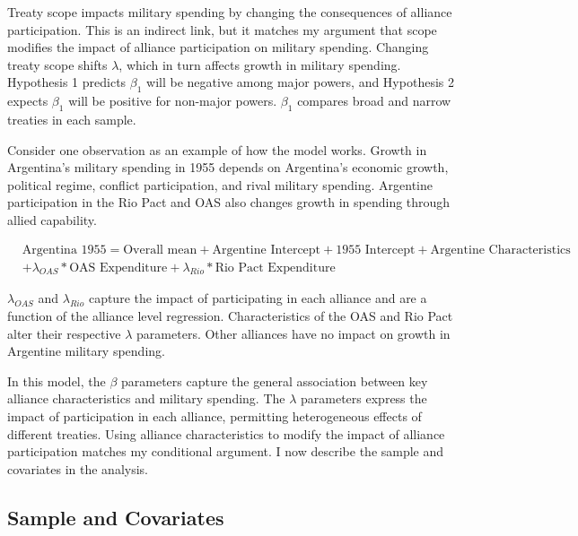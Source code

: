 \documentclass[12pt]{article}
\begin{document}
Treaty scope impacts military spending by changing the consequences of alliance participation.
This is an indirect link, but it matches my argument that scope modifies the impact of alliance participation on military spending.  
Changing treaty scope shifts $\lambda$, which in turn affects growth in military spending.
Hypothesis 1 predicts $\beta_1$ will be negative among major powers, and Hypothesis 2 expects $\beta_1$ will be positive for non-major powers.
$\beta_1$ compares broad and narrow treaties in each sample. 


Consider one observation as an example of how the model works. 
Growth in Argentina's military spending in 1955 depends on Argentina's economic growth, political regime, conflict participation, and rival military spending. 
Argentine participation in the Rio Pact and OAS also changes growth in spending through allied capability. 


\begin{equation}
\begin{split}
& \mbox{Argentina 1955} = \mbox{Overall mean}
+ \mbox{Argentine Intercept} + \mbox{1955 Intercept} 
+ \mbox{Argentine Characteristics} \\
& + \lambda_{OAS} * \mbox{OAS Expenditure} + \lambda_{Rio} * \mbox{Rio Pact Expenditure}
\end{split} 
\end{equation}


$\lambda_{OAS}$ and $\lambda_{Rio}$ capture the impact of participating in each alliance and are a function of the alliance level regression. 
Characteristics of the OAS and Rio Pact alter their respective $\lambda$ parameters.
Other alliances have no impact on growth in Argentine military spending. 


In this model, the $\beta$ parameters capture the general association between key alliance characteristics and military spending. 
The $\lambda$ parameters express the impact of participation in each alliance, permitting heterogeneous effects of different treaties. 
Using alliance characteristics to modify the impact of alliance participation matches my conditional argument. 
I now describe the sample and covariates in the analysis.  



\subsection{Sample and Covariates} 
\end{document}
